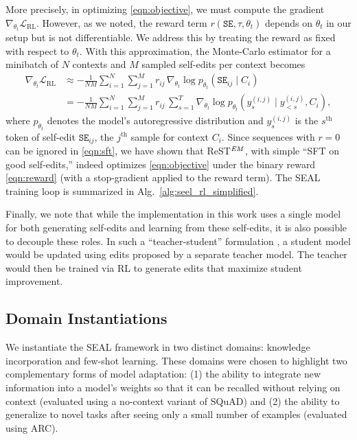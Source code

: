 \documentclass{article}
\newcommand{\methodacronym}{SEAL\xspace}
\begin{document}
More precisely, in optimizing \eqref{eqn:objective}, we must compute the gradient $\nabla_{\theta_t}\mathcal{L}_{\text{RL}}$. However, as we noted, the reward term $r(\texttt{SE}, \tau, \theta_t)$ depends on $\theta_t$ in our setup but is not differentiable. We address this by treating the reward as fixed with respect to $\theta_t$. With this approximation, the Monte-Carlo estimator for a minibatch of \(N\) contexts and \(M\) sampled self-edits per context becomes
\begin{align}
\nabla_{\theta_t}\mathcal{L}_{\text{RL}}
&\approx -\frac{1}{NM}\sum_{i=1}^{N}\sum_{j=1}^{M}
r_{ij}\,
\nabla_{\theta_t}\log p_{\theta_t}(\texttt{SE}_{ij} \mid C_i) \\
&= -\frac{1}{NM}\sum_{i=1}^{N}\sum_{j=1}^{M}
r_{ij}\,
\sum_{s=1}^T \nabla_{\theta_t}\log p_{\theta_t}(y^{(i,j)}_s \mid y^{(i,j)}_{<s}, C_i),
\label{eqn:sft}
\end{align}
where \(p_{\theta_t}\) denotes the model's autoregressive distribution and \(y^{(i,j)}_s\) is the $s^\text{th}$ token of self-edit \(\texttt{SE}_{ij}\), the $j^\text{th}$ sample for context $C_i$. Since sequences with $r=0$ can be ignored in \eqref{eqn:sft}, we have shown that ReST$^{\text{\textit{EM}}}$, with simple ``SFT on good self-edits,'' indeed optimizes \eqref{eqn:objective} under the binary reward \eqref{eqn:reward} (with a stop-gradient applied to the reward term). 
The \methodacronym training loop is summarized in Alg.~\ref{alg:seel_rl_simplified}.

Finally, we note that while the implementation in this work uses a single model for both generating self-edits and learning from these self-edits, it is also possible to decouple these roles. In such a ``teacher-student'' formulation \citep{hinton2015distill}, a student model would be updated using edits proposed by a separate teacher model. The teacher would then be trained via RL to generate edits that maximize student improvement.

\subsection{Domain Instantiations}
\label{subsec:domain_instantiations}
We instantiate the \methodacronym framework in two distinct domains: knowledge incorporation and few-shot learning. These domains were chosen to highlight two complementary forms of model adaptation: (1) the ability to integrate new information into a model's weights so that it can be recalled without relying on context (evaluated using a no-context variant of SQuAD) and (2) the ability to generalize to novel tasks after seeing only a small number of examples (evaluated using ARC).
\end{document}
